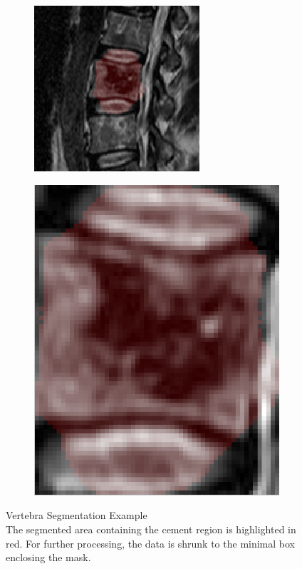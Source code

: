 \documentclass{article}
\begin{document}
{    \begin{figure}[h]
    	\centering
    	\begin{subfigure}[t]{0.45\linewidth}
    		\centering
    		\includegraphics[scale=1.4]{VertebraSegmentationExample_1.png}
    		
    	\end{subfigure}
    	\hfill
    	\begin{subfigure}[t]{0.45\linewidth}
    		\centering
    		\includegraphics[scale=0.4]{VertebraSegmentationExample_2.png}
    	\end{subfigure}
    	\caption{Vertebra Segmentation Example\\
        The segmented area containing the cement region is highlighted in red. For further processing, the data is shrunk to the minimal box enclosing the mask.}
    \end{figure} 
  }	
  \pagebreak
\end{document}
